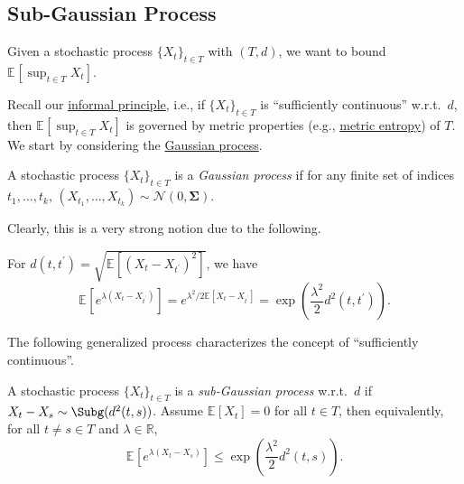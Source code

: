 \subsection{Sub-Gaussian Process}

\begin{prev}
	Given a stochastic process \(\{ X_t \} _{t\in T}\) with \((T, d)\), we want to bound \(\mathbb{E}_{}\left[\sup _{t\in T} X_t \right] \).
\end{prev}

Recall our \hyperref[int:informal-principle]{informal principle}, i.e., if \(\{ X_t \} _{t\in T}\) is ``sufficiently continuous'' w.r.t.\ \(d\), then \(\mathbb{E}_{}\left[\sup _{t\in T} X_t\right] \) is governed by metric properties (e.g., \hyperref[def:metric-entropy]{metric entropy}) of \(T\). We start by considering the \hyperref[def:Gaussian-process]{Gaussian process}.

\begin{definition}\label{def:Gaussian-process}
	A stochastic process \(\{ X_t \} _{t\in T}\) is a \emph{Gaussian process} if for any finite set of indices \({t_1, \dots , t_k}\), \((X_{t_1}, \dots , X_{t_k}) \sim \mathcal{N} (0, \mathbf{\Sigma} ) \).
\end{definition}

Clearly, this is a very strong notion due to the following.

\begin{note}
	For \(d(t, t^{\prime} ) = \sqrt{\mathbb{E}_{}\left[ (X_t - X_{t^{\prime} })^2 \right]}\), we have
	\[
		\mathbb{E}_{}\left[e^{\lambda (X_t - X_{t^{\prime} })} \right]
		= e^{\lambda ^2 / 2 \mathbb{E}_{}\left[X_t - X_{t^{\prime} } \right] }
		= \exp \left( \frac{\lambda ^2}{2} d^2(t, t^{\prime} ) \right).
	\]
\end{note}

The following generalized process characterizes the concept of ``sufficiently continuous''.

\begin{definition}\label{def:sub-Gaussian-process}
	A stochastic process \(\{ X_t \} _{t\in T}\) is a \emph{sub-Gaussian process} w.r.t.\ \(d\) if \(X_t - X_s \sim \Subg(d^2(t, s))\). Assume \(\mathbb{E}_{}\left[X_t \right] = 0\) for all \(t\in T\), then equivalently, for all \(t \neq s \in T\) and \(\lambda \in \mathbb{R} \),
	\[
		\mathbb{E}_{}\left[e^{\lambda (X_t - X_s)} \right]
		\leq \exp \left( \frac{\lambda ^2}{2} d^2(t, s) \right).
	\]
\end{definition}

